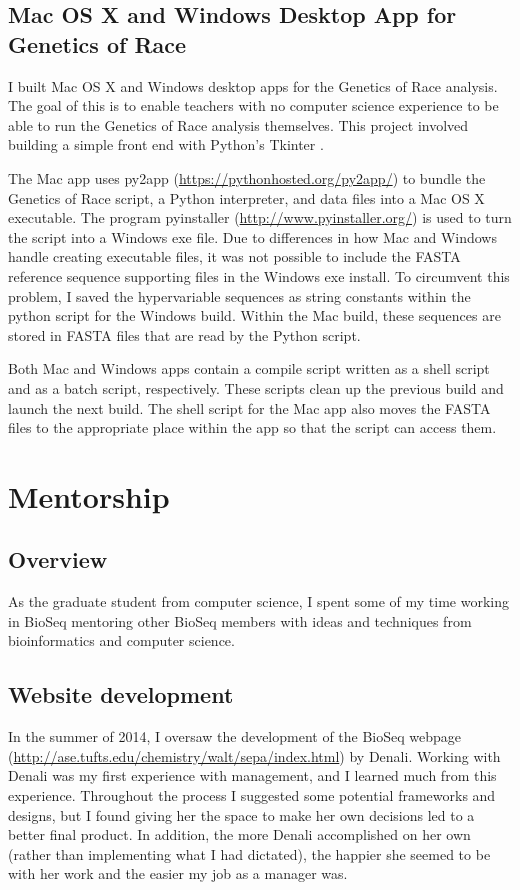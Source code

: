 \documentclass{report}
\begin{document}
\section{Mac OS X and Windows Desktop App for Genetics of Race}

I built Mac OS X and Windows desktop apps for the Genetics of Race analysis. The goal of this is to enable teachers with no computer science experience to be able to run the Genetics of Race analysis themselves. This project involved building a simple front end with Python's Tkinter \cite{shipman2005tkinter}. 

The Mac app uses py2app (\url{https://pythonhosted.org/py2app/}) to bundle the Genetics of Race script, a Python interpreter, and data files into a Mac OS X executable. The program pyinstaller (\url{http://www.pyinstaller.org/}) is used to turn the script into a Windows exe file. Due to differences in how Mac and Windows handle creating executable files, it was not possible to include the FASTA reference sequence supporting files in the Windows exe install. To circumvent this problem, I saved the hypervariable sequences as string constants within the python script for the Windows build. Within the Mac build, these sequences are stored in FASTA files that are read by the Python script. 

Both Mac and Windows apps contain a compile script written as a shell script and as a batch script, respectively. These scripts clean up the previous build and launch the next build. The shell script for the Mac app also moves the FASTA files to the appropriate place within the app so that the script can access them.


\chapter{Mentorship}
\section{Overview}
As the graduate student from computer science, I spent some of my time working in BioSeq mentoring other BioSeq members with ideas and techniques from  bioinformatics and computer science. 

\section{Website development}
In the summer of 2014, I oversaw the development of the BioSeq webpage (\url{http://ase.tufts.edu/chemistry/walt/sepa/index.html}) by Denali. Working with Denali was my first experience with management, and I learned much from this experience. Throughout the process I suggested some potential frameworks and designs, but I found giving her the space to make her own decisions led to a better final product. In addition, the more Denali accomplished on her own (rather than implementing what I had dictated), the happier she seemed to be with her work and the easier my job as a manager was.
\end{document}
